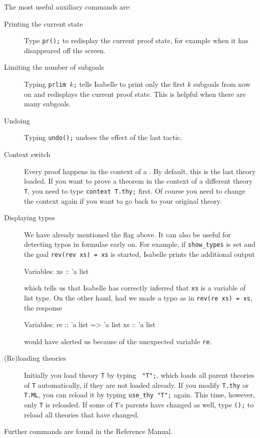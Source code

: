 The most useful auxiliary commands are:
\begin{description}
\item[Printing the current state]
Type \texttt{pr();} to redisplay the current proof state, for example when it
has disappeared off the screen.
\item[Limiting the number of subgoals]
Typing \texttt{prlim $k$;} tells Isabelle to print only the first $k$
subgoals from now on and redisplays the current proof state. This is helpful
when there are many subgoals.
\item[Undoing] Typing \texttt{undo();} undoes the effect of the last
tactic.
\item[Context switch] Every proof happens in the context of a
  . By default, this is the last theory loaded. If
  you want to prove a theorem in the context of a different theory
  \texttt{T}, you need to type \texttt{context T.thy;}
  first. Of course you need to change the context again if you want to go
  back to your original theory.
\item[Displaying types] We have already mentioned the flag
   above. It can also be useful for detecting typos in
  formulae early on. For example, if \texttt{show_types} is set and the goal
  \texttt{rev(rev xs) = xs} is started, Isabelle prints the additional output
\begin{ttbox}
{\out Variables:}
{\out   xs :: 'a list}
\end{ttbox}
which tells us that Isabelle has correctly inferred that
\texttt{xs} is a variable of list type. On the other hand, had we
made a typo as in \texttt{rev(re xs) = xs}, the response
\begin{ttbox}
Variables:
  re :: 'a list => 'a list
  xs :: 'a list
\end{ttbox}
would have alerted us because of the unexpected variable \texttt{re}.
\item[(Re)loading theories]
Initially you load theory \texttt{T} by typing ~\texttt{"T";},
which loads all parent theories of \texttt{T} automatically, if they are not
loaded already. If you modify \texttt{T.thy} or \texttt{T.ML}, you can
reload it by typing \texttt{use_thy~"T";} again. This time, however, only
\texttt{T} is reloaded. If some of \texttt{T}'s parents have changed as well,
type \texttt{();} to reload all theories that have
changed.
\end{description}
Further commands are found in the Reference Manual.


